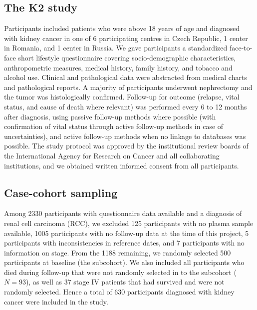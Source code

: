 \documentclass[a4paper,11pt]{article}
\begin{document}
\subsection*{The K2 study}
Participants included patients who were above 18 years of age and diagnosed 
with kidney cancer in one of 6 participating centres in Czech Republic, 1 
center in Romania, and 1 center in Russia. We gave 
participants a standardized face-to-face short lifestyle 
questionnaire covering socio-demographic characteristics, anthropometric 
measures, medical history, family history, and tobacco and alcohol use. 
Clinical and pathological data were abstracted from medical charts and 
pathological reports. A majority of participants underwent nephrectomy and the 
tumor was histologically confirmed. Follow-up for outcome (relapse, vital 
status, and cause of death where relevant) was performed every 6 to 12 months 
after diagnosis, using passive follow-up methods where possible (with 
confirmation of vital status through active follow-up methods in case of 
uncertainties), and active follow-up methods when no linkage to databases was 
possible. The study protocol was approved by the institutional review boards of the 
International Agency for Research on Cancer and all collaborating institutions, and 
we obtained written informed consent from all participants. 

\subsection*{Case-cohort sampling}
Among 2330 participants with questionnaire data available and a diagnosis of 
renal cell carcinoma (RCC), we excluded 125 participants 
with no plasma sample available, 1005 participants with no follow-up data at 
the time of this project, 5 participants with inconsistencies in reference 
dates, and 7 participants with no information on stage. From the 1188 
remaining, we randomly selected 500 participants at baseline (the subcohort). 
We also included all participants who died during follow-up that were not 
randomly selected in to the subcohort ($N=93$), as well as 37 stage IV patients 
that had survived and were not randomly selected. Hence a total of 
630 participants diagnosed with kidney cancer were included in the study.
\end{document}
